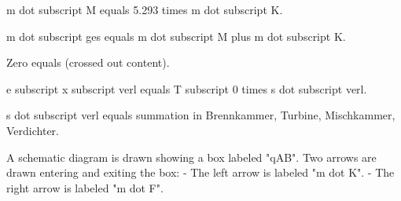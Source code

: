 m dot subscript M equals 5.293 times m dot subscript K.  

m dot subscript ges equals m dot subscript M plus m dot subscript K.  

Zero equals (crossed out content).  

e subscript x subscript verl equals T subscript 0 times s dot subscript verl.  

s dot subscript verl equals summation in Brennkammer, Turbine, Mischkammer, Verdichter.

A schematic diagram is drawn showing a box labeled "qAB".  
Two arrows are drawn entering and exiting the box:  
- The left arrow is labeled "m dot K".  
- The right arrow is labeled "m dot F".